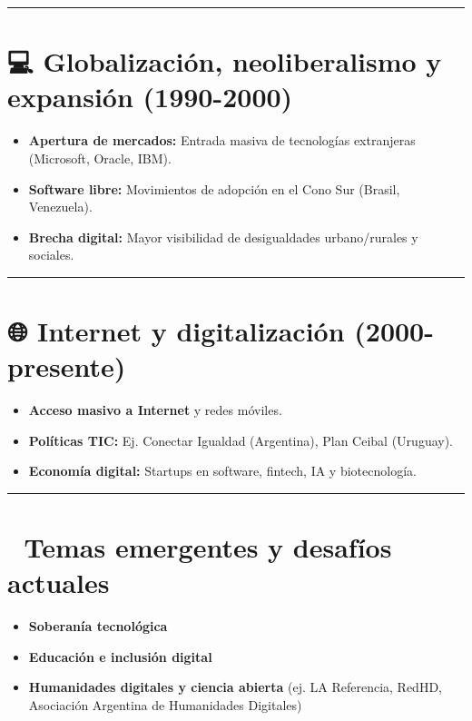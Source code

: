 \documentclass[
  letterpaper,
  DIV=11,
  numbers=noendperiod]{scrreprt}
\providecommand{\tightlist}{%
  \setlength{\itemsep}{0pt}\setlength{\parskip}{0pt}}
\begin{document}
\begin{center}\rule{0.5\linewidth}{0.5pt}\end{center}

\section{💻 Globalización, neoliberalismo y expansión
(1990-2000)}\label{globalizaciuxf3n-neoliberalismo-y-expansiuxf3n-1990-2000}

\begin{itemize}
\tightlist
\item
  \textbf{Apertura de mercados:} Entrada masiva de tecnologías
  extranjeras (Microsoft, Oracle, IBM).
\item
  \textbf{Software libre:} Movimientos de adopción en el Cono Sur
  (Brasil, Venezuela).
\item
  \textbf{Brecha digital:} Mayor visibilidad de desigualdades
  urbano/rurales y sociales.
\end{itemize}

\begin{center}\rule{0.5\linewidth}{0.5pt}\end{center}

\section{🌐 Internet y digitalización
(2000-presente)}\label{internet-y-digitalizaciuxf3n-2000-presente}

\begin{itemize}
\tightlist
\item
  \textbf{Acceso masivo a Internet} y redes móviles.
\item
  \textbf{Políticas TIC:} Ej. Conectar Igualdad (Argentina), Plan Ceibal
  (Uruguay).
\item
  \textbf{Economía digital:} Startups en software, fintech, IA y
  biotecnología.
\end{itemize}

\begin{center}\rule{0.5\linewidth}{0.5pt}\end{center}

\section{🧠 Temas emergentes y desafíos
actuales}\label{temas-emergentes-y-desafuxedos-actuales}

\begin{itemize}
\tightlist
\item
  \textbf{Soberanía tecnológica}\\
\item
  \textbf{Educación e inclusión digital}\\
\item
  \textbf{Humanidades digitales y ciencia abierta} (ej. LA Referencia,
  RedHD, Asociación Argentina de Humanidades Digitales)
\end{itemize}
\end{document}
